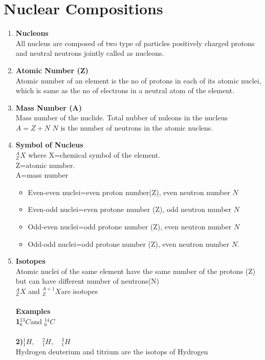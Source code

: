 \section{Nuclear Compositions}
\begin{enumerate}
\item  \textbf{Nucleons}\\All nucleus are composed of two type of particles positively charged protons and neutral neutrons jointly called as nucleons.
\item \textbf{ Atomic Number (Z)}\\
 Atomic number of an element is the no of protons in each of its atomic nuclei, which is same as the no of electrons in a neutral atom of the element.
 \item \textbf{ Mass Number (A)}\\
 Mass number of the nuclide. Total nubber of nuleons in the nucleus $A=Z+N$ $N$ is the number of neutrons in the atomic nuclens.
 \item \textbf{ Symbol of Nucleus}\\
 $^A_ZX$
 where X=chemical symbol of the element.\\
 Z=atomic number.\\
 A=mass number
 \begin{itemize}
 	\item Even-even nuclei=even proton number(Z), even neutron number $N$
 \item 	Even-odd nuclei=even protone number (Z), odd neutron number $N$
 \item 	Odd-even nuclei=odd protone number (Z), even neutron number $N$
 \item	Odd-odd nuclei=odd protone number (Z), even neutron number $N$.
 \end{itemize}
\item \textbf{Isotopes}\\
Atomic nuclei of the same element have the same number of the protons (Z) but can have different number of neutrons(N)\\
$^A_ZX$ \quad and \quad $^{A+1}_ZX$\quad  are isotopes\\\\
\textbf{Examples}\\
\textbf{1}\quad $^{13}_6C$\quad and \quad $^{14}_6 C$\\\\
\textbf{2)}\quad $^1_1H,\quad^2_1H,\quad^3_1H$\\
 Hydrogen deuterium and titrium are the isotops of Hydrogen\\

\end{enumerate}
